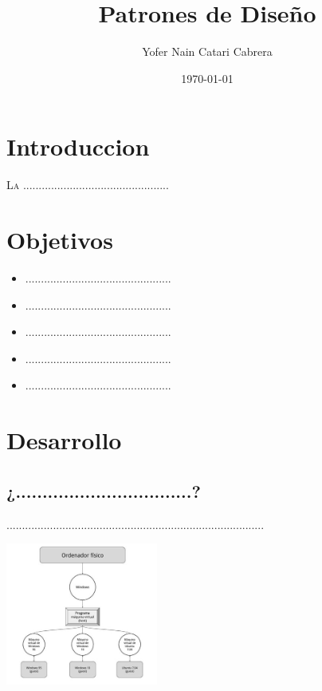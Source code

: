 \documentclass[twoside,twocolumn]{article}
\title{Patrones de Diseño} %
\author{Yofer Nain Catari Cabrera}
\date{\today} %
\begin{document}
\maketitle


\section{Introduccion}

\lettrine[nindent=0em,lines=3]{L}a ...............................................




\section{Objetivos}

\begin{itemize}
\item ...............................................
\item ...............................................
\item ...............................................
\item ...............................................
\item ...............................................


\end{itemize}





\section{Desarrollo}

\subsection{¿.................................?}

...................................................................................

\begin{center}
	\includegraphics[width=5cm]{./Imagenes/virtualizacion} 
	\end{center}
\end{document}
